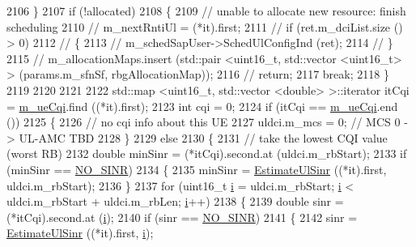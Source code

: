 \begin{DoxyCode}
2106         \}
2107       \textcolor{keywordflow}{if} (!allocated)
2108         \{
2109           \textcolor{comment}{// unable to allocate new resource: finish scheduling}
2110 \textcolor{comment}{//          m\_nextRntiUl = (*it).first;}
2111 \textcolor{comment}{//          if (ret.m\_dciList.size () > 0)}
2112 \textcolor{comment}{//            \{}
2113 \textcolor{comment}{//              m\_schedSapUser->SchedUlConfigInd (ret);}
2114 \textcolor{comment}{//            \}}
2115 \textcolor{comment}{//          m\_allocationMaps.insert (std::pair <uint16\_t, std::vector <uint16\_t> > (params.m\_sfnSf,
       rbgAllocationMap));}
2116 \textcolor{comment}{//          return;}
2117           \textcolor{keywordflow}{break};
2118         \}
2119 
2120 
2121 
2122       std::map <uint16\_t, std::vector <double> >::iterator itCqi = \hyperlink{classns3_1_1CqaFfMacScheduler_a263024e4342a26bfc2fabd0697da8641}{m\_ueCqi}.find ((*it).first);
2123       \textcolor{keywordtype}{int} cqi = 0;
2124       \textcolor{keywordflow}{if} (itCqi == \hyperlink{classns3_1_1CqaFfMacScheduler_a263024e4342a26bfc2fabd0697da8641}{m\_ueCqi}.end ())
2125         \{
2126           \textcolor{comment}{// no cqi info about this UE}
2127           uldci.m\_mcs = 0; \textcolor{comment}{// MCS 0 -> UL-AMC TBD}
2128         \}
2129       \textcolor{keywordflow}{else}
2130         \{
2131           \textcolor{comment}{// take the lowest CQI value (worst RB)}
2132           \textcolor{keywordtype}{double} minSinr = (*itCqi).second.at (uldci.m\_rbStart);
2133           \textcolor{keywordflow}{if} (minSinr == \hyperlink{cqa-ff-mac-scheduler_8h_a520d71777be043568160c783a9c65fd5}{NO\_SINR})
2134             \{
2135               minSinr = \hyperlink{classns3_1_1CqaFfMacScheduler_ad0d681a7fa2872f539e63c511485ae0e}{EstimateUlSinr} ((*it).first, uldci.m\_rbStart);
2136             \}
2137           \textcolor{keywordflow}{for} (uint16\_t \hyperlink{bernuolliDistribution_8m_a6f6ccfcf58b31cb6412107d9d5281426}{i} = uldci.m\_rbStart; \hyperlink{bernuolliDistribution_8m_a6f6ccfcf58b31cb6412107d9d5281426}{i} < uldci.m\_rbStart + uldci.m\_rbLen; 
      \hyperlink{bernuolliDistribution_8m_a6f6ccfcf58b31cb6412107d9d5281426}{i}++)
2138             \{
2139               \textcolor{keywordtype}{double} sinr = (*itCqi).second.at (\hyperlink{bernuolliDistribution_8m_a6f6ccfcf58b31cb6412107d9d5281426}{i});
2140               \textcolor{keywordflow}{if} (sinr == \hyperlink{cqa-ff-mac-scheduler_8h_a520d71777be043568160c783a9c65fd5}{NO\_SINR})
2141                 \{
2142                   sinr = \hyperlink{classns3_1_1CqaFfMacScheduler_ad0d681a7fa2872f539e63c511485ae0e}{EstimateUlSinr} ((*it).first, \hyperlink{bernuolliDistribution_8m_a6f6ccfcf58b31cb6412107d9d5281426}{i});

\end{DoxyCode}
